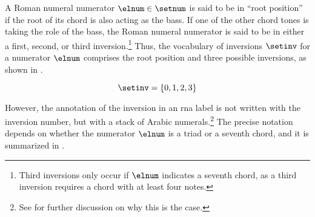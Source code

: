 
A Roman numeral numerator $\elnum \in \setnum$ is said to be
in ``root position'' if the root of its chord is also acting
as the bass. If one of the other chord tones is taking the
role of the bass, the Roman numeral numerator is said to be
in either a first, second, or third
inversion.\footnote{Third inversions only occur if $\elnum$
indicates a seventh chord, as a third inversion requires a
chord with at least four notes.} Thus, the vocabulary of
inversions $\setinv$ for a numerator $\elnum$ comprises the
root position and three possible inversions, as shown in
.

\begin{equation}
    \label{eq:inversion_vocabulary}
    \setinv = \{ 0, 1, 2, 3 \}
\end{equation}

However, the annotation of the inversion in an \gls{rna}
label is not written with the inversion number, but with a
stack of Arabic numerals.\footnote{See
 for further
discussion on why this is the case.} The precise notation
depends on whether the numerator $\elnum$ is a triad or a
seventh chord, and it is summarized in .


